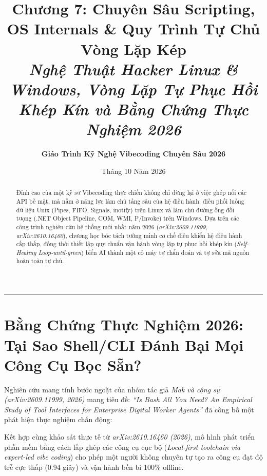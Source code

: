 \documentclass[a4paper,11pt]{article}
\title{\textbf{Chương 7: Chuyên Sâu Scripting, OS Internals \& Quy Trình Tự Chủ Vòng Lặp Kép}\\[0.3em]
\large\textit{Nghệ Thuật Hacker Linux \& Windows, Vòng Lặp Tự Phục Hồi Khép Kín và Bằng Chứng Thực Nghiệm 2026}}
\author{\textbf{Giáo Trình Kỹ Nghệ Vibecoding Chuyên Sâu 2026}}
\date{Tháng 10 Năm 2026}
\begin{document}
\maketitle

\begin{abstract}
Đỉnh cao của một kỹ sư Vibecoding thực chiến không chỉ dừng lại ở việc ghép nối các API bề mặt, mà nằm ở năng lực làm chủ tầng sâu của hệ điều hành: điều phối luồng dữ liệu Unix (Pipes, FIFO, Signals, inotify) trên Linux và làm chủ đường ống đối tượng (.NET Object Pipeline, COM, WMI, P/Invoke) trên Windows. Dựa trên các công trình nghiên cứu hệ thống mới nhất năm 2026 (\textit{arXiv:2609.11999, arXiv:2610.16460}), chương học bóc tách tường minh cơ chế điều khiển hệ điều hành cấp thấp, đồng thời thiết lập quy chuẩn vận hành vòng lặp tự phục hồi khép kín (\textit{Self-Healing Loop-until-green}) biến AI thành một cỗ máy tự chẩn đoán và tự sửa mã nguồn hoàn toàn tự chủ.
\end{abstract}

\vspace{1em}
\rule{\textwidth}{0.4pt}

\section{Bằng Chứng Thực Nghiệm 2026: Tại Sao Shell/CLI Đánh Bại Mọi Công Cụ Bọc Sẵn?}

Nghiên cứu mang tính bước ngoặt của nhóm tác giả \textit{Mak và cộng sự (arXiv:2609.11999, 2026)} mang tiêu đề: \textit{``Is Bash All You Need? An Empirical Study of Tool Interfaces for Enterprise Digital Worker Agents''} đã công bố một phát hiện thực nghiệm chấn động:
\begin{center}
\end{center}

Kết hợp cùng khảo sát thực tế từ \textit{arXiv:2610.16460 (2026)}, mô hình phát triển phần mềm bằng cách lắp ghép các công cụ cục bộ (\textit{Local-first toolchain via expert-led vibe coding}) cho phép một người không chuyên tự tạo ra công cụ đạt độ trễ cực thấp (0.94 giây) và vận hành bền bỉ 100\% offline.
\end{document}
